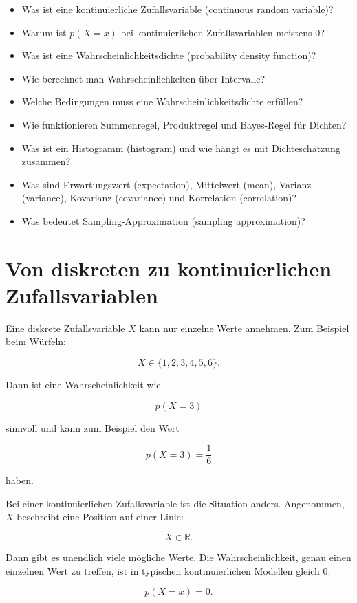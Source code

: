 \begin{itemize}
    \item Was ist eine kontinuierliche Zufallsvariable (continuous random variable)?
    \item Warum ist \(p(X=x)\) bei kontinuierlichen Zufallsvariablen meistens \(0\)?
    \item Was ist eine Wahrscheinlichkeitsdichte (probability density function)?
    \item Wie berechnet man Wahrscheinlichkeiten über Intervalle?
    \item Welche Bedingungen muss eine Wahrscheinlichkeitsdichte erfüllen?
    \item Wie funktionieren Summenregel, Produktregel und Bayes-Regel für Dichten?
    \item Was ist ein Histogramm (histogram) und wie hängt es mit Dichteschätzung zusammen?
    \item Was sind Erwartungswert (expectation), Mittelwert (mean), Varianz (variance), Kovarianz (covariance) und Korrelation (correlation)?
    \item Was bedeutet Sampling-Approximation (sampling approximation)?
\end{itemize}

\section{Von diskreten zu kontinuierlichen Zufallsvariablen}

Eine diskrete Zufallsvariable \(X\) kann nur einzelne Werte annehmen.
Zum Beispiel beim Würfeln:

\[
    X \in \{1,2,3,4,5,6\}.
\]

Dann ist eine Wahrscheinlichkeit wie

\[
    p(X=3)
\]

sinnvoll und kann zum Beispiel den Wert

\[
    p(X=3) = \frac{1}{6}
\]

haben.

Bei einer kontinuierlichen Zufallsvariable ist die Situation anders.
Angenommen, \(X\) beschreibt eine Position auf einer Linie:

\[
    X \in \mathbb{R}.
\]

Dann gibt es unendlich viele mögliche Werte.
Die Wahrscheinlichkeit, genau einen einzelnen Wert zu treffen, ist in typischen kontinuierlichen Modellen gleich \(0\):

\[
    p(X=x) = 0.
\]

